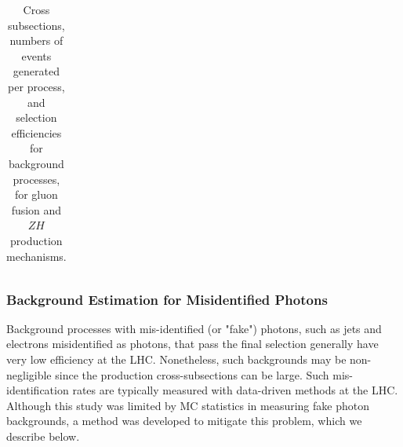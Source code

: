 \begin{table}[]
{\begin{tabular}{| c | c | c | c | c | c| c| }
\hline
\end{tabular}
}
\caption{Cross subsections, numbers of events generated per process, and selection efficiencies for background processes, for gluon fusion and $ZH$ production mechanisms.}
\label{tab:sel_eff}
\end{table}

\subsubsection{Background Estimation for Misidentified Photons}

Background processes with mis-identified (or "fake") photons, such as jets and electrons misidentified as photons, that pass the final selection generally have very low efficiency at the LHC. Nonetheless, such backgrounds may be non-negligible since the production cross-subsections can be large. Such mis-identification rates are typically measured with data-driven methods at the LHC.
%
Although this study was limited by MC statistics in measuring fake photon backgrounds, a method was developed to mitigate this problem, which we describe below.

